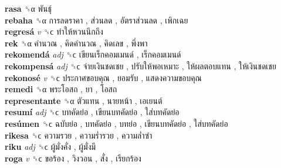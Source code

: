\textbf{rasa} ␝α   พันธุ์   \\
\textbf{rebaha} ␝α   การลดราคา ,  ส่วนลด ,  อัตราส่วนลด ,  เพิกเฉย   \\
\textbf{regresá} \emph{v}  ␝ϲ   ทำให้หวนนึกถึง   \\
\textbf{rek} ␝α   คำนวณ ,  คิดคำนวณ ,  คิดเลข ,  พึ่งพา   \\
\textbf{rekomendá} \emph{adj}  ␝ϲ   เขียนเร็กคอมเมนด์ ,  เร็กคอมเมนด์   \\
\textbf{rekompensá} \emph{adj}  ␝ϲ   จ่ายเงินชดเชย ,  ปรับให้พอเหมาะ ,  ให้ผลตอบแทน ,  ให้เงินชดเชย   \\
\textbf{rekonosé} \emph{v}  ␝ϲ   ประกาศขอบคุณ ,  ยอมรับ ,  แสดงความขอบคุณ   \\
\textbf{remedi} ␝α   พระโอสถ ,  ยา ,  โอสถ   \\
\textbf{representante} ␝α   ตัวแทน ,  นายหน้า ,  เอเยนต์   \\
\textbf{resumí} \emph{adj}  ␝ϲ   บทคัดย่อ ,  เขียนบทคัดย่อ ,  ใส่บทคัดย่อ   \\
\textbf{resúmen} ␝ϲ   ฉบับย่อ ,  บทคัดย่อ ,  บทย่อ ,  เขียนบทคัดย่อ ,  ใส่บทคัดย่อ   \\
\textbf{rikesa} ␝ϲ   ความรวย ,  ความร่ำรวย ,  ความล่ำซำ   \\
\textbf{riku} \emph{adj}  ␝ϲ   ผู้มั่งคั่ง ,  ผู้มั่งมี   \\
\textbf{roga} \emph{v}  ␝ϲ   ขอร้อง ,  วิงวอน ,  สั่ง ,  เรียกร้อง   \\
